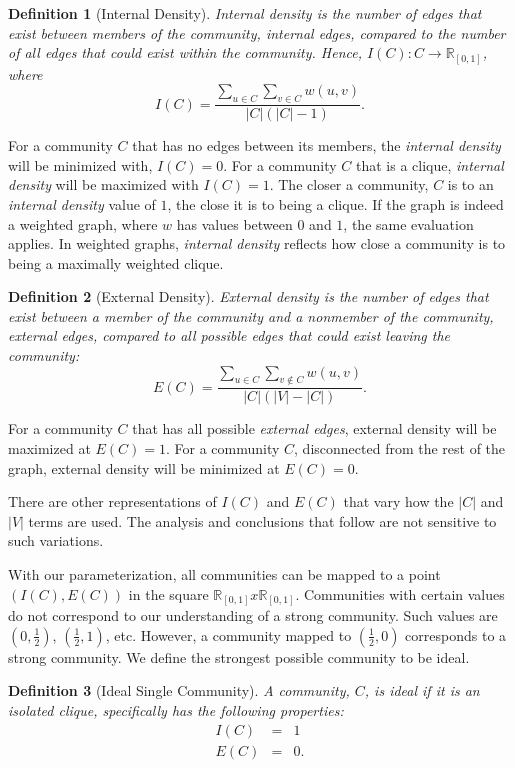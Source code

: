 \documentclass[phd,tocprelim]{cornell}
\newtheorem{definition}{Definition}
\begin{document}
\begin{definition}[Internal Density]
\label{def:int_density_single}
Internal density is the number of edges that exist between members of the community, {\it internal edges}, compared to the number of all edges that could exist within the community.  Hence, $I(C) : C \rightarrow \mathbb{R}_{[0, 1]}$, where
\begin{equation}
 I(C) =\frac{\sum_{u \in C} \sum_{v \in C} w(u,v)}{|C|(|C| - 1)} .
\end{equation}
\label{def_int_density}
\end{definition}

For a community $C$ that has no edges between its members, the {\it internal density} will be minimized with, $I(C) = 0$.  For a community $C$ that is a clique, {\it internal density} will be maximized with $I(C) = 1$.  The closer a community, $C$ is to an {\it internal density} value of $1$, the close it is to being a clique.  If the graph is indeed a weighted graph, where $w$ has values between $0$ and $1$, the same evaluation applies.  In weighted graphs, {\it internal density} reflects how close a community is to being a maximally weighted clique.

\begin{definition}[External Density]
\label{def:ext_density_single}
External density is the number of edges that exist between a member of the community and a nonmember of the community, {\it external edges}, compared to all possible edges that could exist leaving the community:
\begin{equation}
 E(C) = \frac{\sum_{u \in C} \sum_{v \notin C} w(u,v)}{|C|(|V| - |C|)}.
\end{equation}
\label{def_ext_density}
\end{definition}

For a community $C$ that has all possible {\it external edges}, external density will be maximized at $E(C)=1$.  For a community $C$, disconnected from the rest of the graph, external density will be minimized at $E(C) = 0$.

There are other representations of $I(C)$ and $E(C)$ that vary how the $|C|$ and $|V|$ terms are used.  The analysis and conclusions that follow are not sensitive to such variations.

With our parameterization, all communities can be mapped to a point $(I(C), E(C))$ in the square $\mathbb{R}_{[0, 1]} x \mathbb{R}_{[0, 1]}$.   Communities with certain values do not correspond to our understanding of a strong community.  Such values are $\left(0, \frac{1}{2}\right)$, $\left(\frac{1}{2}, 1\right)$, etc.  However, a community mapped to $\left(\frac{1}{2}, 0\right)$ corresponds to a strong community.  We define the strongest possible community to be ideal.
\begin{definition}[Ideal Single Community]
A community, $C$, is ideal if it is an isolated clique, specifically has the following properties:
\begin{eqnarray*}
I(C) &=& 1\\
E(C) &=& 0.
\end{eqnarray*}
\end{definition}
\end{document}
